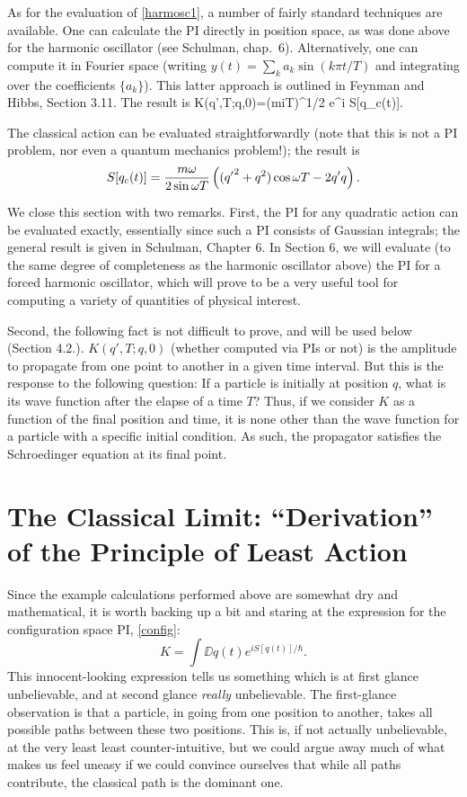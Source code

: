 \documentclass[12pt]{article}
\begin{document}
As for the evaluation of \eqref{harmosc1}, a number of fairly standard
techniques are available. One can calculate
the PI directly in position space,
as was done above for the harmonic oscillator (see Schulman,
chap.~6). Alternatively, one can compute it in Fourier space
(writing $y(t)=\sum_k a_k\sin(k\pi t/T)$ and integrating over the
coefficients $\{a_k\}$). This latter approach is outlined in Feynman
and Hibbs, Section 3.11. The result is
\beq
K(q',T;q,0)=\left({m\om{}\pi i\sin\om T}\right)^{1/2}
e^{i S[q_c(t)]}.
\label{harmosc2}\eeq

The classical action can be evaluated straightforwardly (note that this
is not a PI problem, nor even a quantum mechanics problem!);
the result is
\[ S[q_c(t)]={m{\omega}\over2\sin{\omega} T}
\left(({q'}^2+q^2)\cos{\omega} T-2q'q\right).\]

We close this section with two remarks. First,
the PI for any quadratic action
can be evaluated exactly, essentially since such a PI consists of
Gaussian integrals; the general result is given in Schulman, Chapter 6.
In Section 6, we will evaluate (to the same degree of completeness as
the harmonic oscillator above) the PI for a forced harmonic
oscillator, which will prove to be a very useful tool for computing a
variety of quantities of physical interest.

Second, the following fact is not difficult to prove, and will be used
below (Section 4.2.). $K(q',T;q,0)$ (whether computed via PIs or not)
is the amplitude to propagate from
one point to another in a given time interval. But this is the
response to the following question: If a particle is initially at
position $q$, what is its wave function after the elapse of a time
$T$? Thus, if we consider $K$ as a
function of the final position and time, it is none other than the
wave function for a particle with a specific initial condition. As
such, the propagator satisfies the Schroedinger equation at its final
point.


\section[Classical Limit]
{The Classical Limit: ``Derivation'' of the Principle of Least Action}

Since the example calculations performed above are somewhat dry and
mathematical, it is worth backing up a bit and staring at the
expression for the configuration space PI, \eqref{config}:
\[ K=\int\DD q(t) e^{i S[q(t)]/\hbar}.
\]
This innocent-looking expression tells us something which is at first
glance unbelievable, and at second glance {\em really} unbelievable.
The first-glance observation is that a particle, in going from one
position to another, takes all possible paths between these two
positions. This is, if not actually unbelievable, at the very least
least counter-intuitive, but we could argue away much of what makes us
feel uneasy if we could convince ourselves that while all paths
contribute, the classical path is the dominant one. 
\end{document}

